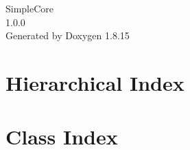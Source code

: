 \let\mypdfximage\pdfximage\def\pdfximage{\immediate\mypdfximage}\documentclass[twoside]{book}
\newcommand{\+}{\discretionary{\mbox{\scriptsize$\hookleftarrow$}}{}{}}
\newcommand{\clearemptydoublepage}{%
  \newpage{\pagestyle{empty}\cleardoublepage}%
}
\begin{document}
\hypersetup{pageanchor=false,
             bookmarksnumbered=true,
             pdfencoding=unicode
            }
\begin{titlepage}
\vspace*{7cm}
\begin{center}%
{\Large Simple\+Core \\[1ex]\large 1.\+0.\+0 }\\
\vspace*{1cm}
{\large Generated by Doxygen 1.8.15}\\
\end{center}
\end{titlepage}
\clearemptydoublepage
{}
\tableofcontents
\clearemptydoublepage
{}
\hypersetup{pageanchor=true}

\chapter{Hierarchical Index}

\chapter{Class Index}

\end{document}

